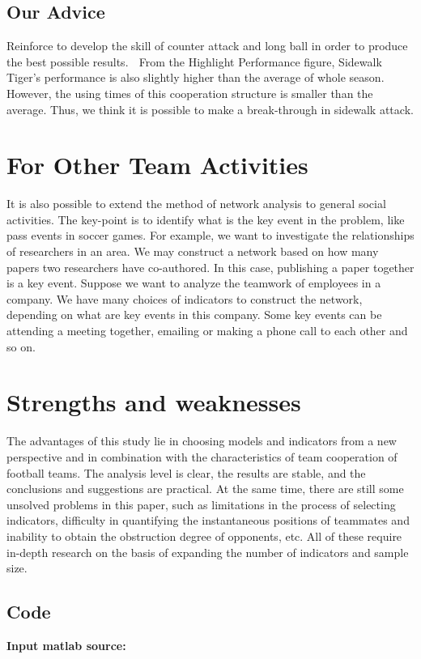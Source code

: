\documentclass{mcmthesis}
\begin{document}
\subsection{Our Advice}
Reinforce to develop the skill of
counter attack and long ball in order
to produce the best possible results.
 From the Highlight Performance
figure, Sidewalk Tiger’s
performance is also slightly higher
than the average of whole season.
However, the using times of this
cooperation structure is smaller than
the average. Thus, we think it is
possible to make a break-through in
sidewalk attack.

\section{For Other Team Activities}
It is also possible to extend the method of network analysis to general social activities.
The key-point is to identify what is the key event in the problem, like pass events
in soccer games. For example, we want to investigate the relationships of researchers
in an area. We may construct a network based on how many papers two researchers
have co-authored. In this case, publishing a paper together is a key event. Suppose we
want to analyze the teamwork of employees in a company. We have many choices of
indicators to construct the network, depending on what are key events in this company.
Some key events can be attending a meeting together, emailing or making a phone call
to each other and so on.

\section{Strengths and weaknesses}
The advantages of this study lie in choosing models and indicators from a new
perspective and in combination with the characteristics of team cooperation of
football teams. The analysis level is clear, the results are stable, and the conclusions
and suggestions are practical. At the same time, there are still some unsolved
problems in this paper, such as limitations in the process of selecting indicators,
difficulty in quantifying the instantaneous positions of teammates and inability to
obtain the obstruction degree of opponents, etc. All of these require in-depth research
on the basis of expanding the number of indicators and sample size.

\newpage
\nocite{*}



\begin{appendices}
        \section{Code}
        \textbf{\textcolor[rgb]{0.98,0.00,0.00}{Input matlab source:}}
        
\end{appendices}
\end{document}
